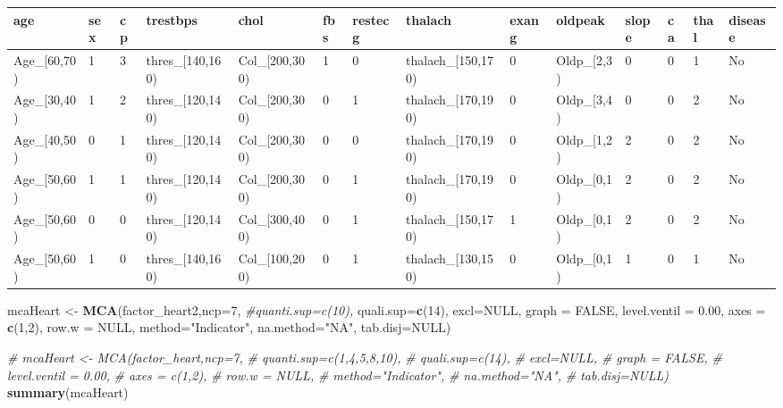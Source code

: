 \documentclass[]{article}
\newenvironment{Shaded}{\begin{snugshade}}{\end{snugshade}}
\newcommand{\KeywordTok}[1]{\textcolor[rgb]{0.13,0.29,0.53}{\textbf{#1}}}
\newcommand{\DataTypeTok}[1]{\textcolor[rgb]{0.13,0.29,0.53}{#1}}
\newcommand{\DecValTok}[1]{\textcolor[rgb]{0.00,0.00,0.81}{#1}}
\newcommand{\FloatTok}[1]{\textcolor[rgb]{0.00,0.00,0.81}{#1}}
\newcommand{\StringTok}[1]{\textcolor[rgb]{0.31,0.60,0.02}{#1}}
\newcommand{\CommentTok}[1]{\textcolor[rgb]{0.56,0.35,0.01}{\textit{#1}}}
\newcommand{\OtherTok}[1]{\textcolor[rgb]{0.56,0.35,0.01}{#1}}
\newcommand{\NormalTok}[1]{#1}
\begin{document}
\begin{longtable}[]{@{}llllllllllllll@{}}
\toprule
age & sex & cp & trestbps & chol & fbs & restecg & thalach & exang &
oldpeak & slope & ca & thal & disease\tabularnewline
\midrule
\endhead
Age\_{[}60,70) & 1 & 3 & thres\_{[}140,160) & Col\_{[}200,300) & 1 & 0 &
thalach\_{[}150,170) & 0 & Oldp\_{[}2,3) & 0 & 0 & 1 & No\tabularnewline
Age\_{[}30,40) & 1 & 2 & thres\_{[}120,140) & Col\_{[}200,300) & 0 & 1 &
thalach\_{[}170,190) & 0 & Oldp\_{[}3,4) & 0 & 0 & 2 & No\tabularnewline
Age\_{[}40,50) & 0 & 1 & thres\_{[}120,140) & Col\_{[}200,300) & 0 & 0 &
thalach\_{[}170,190) & 0 & Oldp\_{[}1,2) & 2 & 0 & 2 & No\tabularnewline
Age\_{[}50,60) & 1 & 1 & thres\_{[}120,140) & Col\_{[}200,300) & 0 & 1 &
thalach\_{[}170,190) & 0 & Oldp\_{[}0,1) & 2 & 0 & 2 & No\tabularnewline
Age\_{[}50,60) & 0 & 0 & thres\_{[}120,140) & Col\_{[}300,400) & 0 & 1 &
thalach\_{[}150,170) & 1 & Oldp\_{[}0,1) & 2 & 0 & 2 & No\tabularnewline
Age\_{[}50,60) & 1 & 0 & thres\_{[}140,160) & Col\_{[}100,200) & 0 & 1 &
thalach\_{[}130,150) & 0 & Oldp\_{[}0,1) & 1 & 0 & 1 & No\tabularnewline
\bottomrule
\end{longtable}

\begin{Shaded}
\begin{Highlighting}[]
\NormalTok{mcaHeart <-}\StringTok{ }\KeywordTok{MCA}\NormalTok{(factor_heart2,}\DataTypeTok{ncp=}\DecValTok{7}\NormalTok{,}
               \CommentTok{#quanti.sup=c(10),}
               \DataTypeTok{quali.sup=}\KeywordTok{c}\NormalTok{(}\DecValTok{14}\NormalTok{),}
               \DataTypeTok{excl=}\OtherTok{NULL}\NormalTok{,}
               \DataTypeTok{graph =} \OtherTok{FALSE}\NormalTok{,}
               \DataTypeTok{level.ventil =} \FloatTok{0.00}\NormalTok{,}
               \DataTypeTok{axes =} \KeywordTok{c}\NormalTok{(}\DecValTok{1}\NormalTok{,}\DecValTok{2}\NormalTok{),}
               \DataTypeTok{row.w =} \OtherTok{NULL}\NormalTok{,}
               \DataTypeTok{method=}\StringTok{"Indicator"}\NormalTok{,}
               \DataTypeTok{na.method=}\StringTok{"NA"}\NormalTok{,}
               \DataTypeTok{tab.disj=}\OtherTok{NULL}\NormalTok{)}

\CommentTok{# mcaHeart <- MCA(factor_heart,ncp=7,}
\CommentTok{#                quanti.sup=c(1,4,5,8,10),}
\CommentTok{#                quali.sup=c(14),}
\CommentTok{#                excl=NULL,}
\CommentTok{#                graph = FALSE,}
\CommentTok{#                level.ventil = 0.00,}
\CommentTok{#                axes = c(1,2),}
\CommentTok{#                row.w = NULL,}
\CommentTok{#                method="Indicator",}
\CommentTok{#                na.method="NA",}
\CommentTok{#                tab.disj=NULL)}
\KeywordTok{summary}\NormalTok{(mcaHeart)}
\end{Highlighting}
\end{Shaded}
\end{document}
